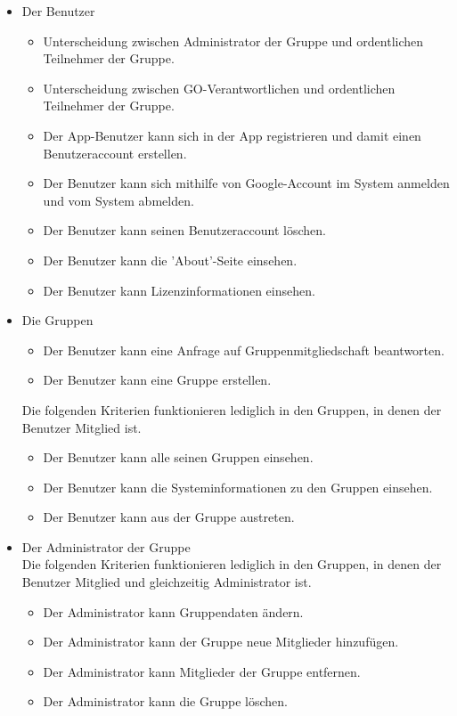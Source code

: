 \documentclass[parskip=full]{scrartcl}
\begin{document}
\begin{itemize}[itemsep=0pt]
	\item Der Benutzer  
	\begin{itemize}
		\item Unterscheidung zwischen Administrator der Gruppe und ordentlichen Teilnehmer der Gruppe.
		\item Unterscheidung zwischen GO-Verantwortlichen und ordentlichen Teilnehmer der Gruppe.
	 	\item Der App-Benutzer kann sich in der App registrieren und damit einen Benutzeraccount erstellen.
	 	\item Der Benutzer kann sich mithilfe von Google-Account im System anmelden und vom System abmelden.
	 	\item Der Benutzer kann seinen Benutzeraccount löschen.
	 	\item Der Benutzer kann die 'About'-Seite einsehen.
	 	\item Der Benutzer kann Lizenzinformationen einsehen.
	\end{itemize} 
	
	\item Die Gruppen
	\begin{itemize}
	 	\item Der Benutzer kann eine Anfrage auf Gruppenmitgliedschaft beantworten.
	 	\item Der Benutzer kann eine Gruppe erstellen.
	 \end{itemize}
	 Die folgenden Kriterien funktionieren lediglich in den Gruppen, in denen der Benutzer Mitglied ist.
	 \begin{itemize}
	 	\item Der Benutzer kann alle seinen Gruppen einsehen.
	 	\item Der Benutzer kann die Systeminformationen zu den Gruppen einsehen.
	 	\item Der Benutzer kann aus der Gruppe austreten.
	\end{itemize}
	
	\item Der Administrator der Gruppe\\
	Die folgenden Kriterien funktionieren lediglich in den Gruppen, in denen der Benutzer Mitglied und gleichzeitig Administrator ist.
	\begin{itemize}
		\item Der Administrator kann Gruppendaten ändern.
		\item Der Administrator kann der Gruppe neue Mitglieder hinzufügen.
		\item Der Administrator kann Mitglieder der Gruppe entfernen.
		\item Der Administrator kann die Gruppe löschen.  
	\end{itemize}
	

\end{itemize}
\end{document}
